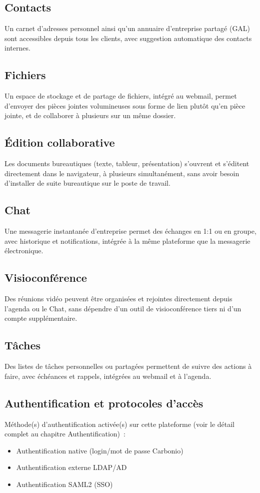 \documentclass[11pt,a4paper]{report}
\begin{document}
\subsection{Contacts}
Un carnet d'adresses personnel ainsi qu'un annuaire d'entreprise partagé (GAL) sont accessibles depuis tous les clients, avec suggestion automatique des contacts internes.\allowbreak{}

\subsection{Fichiers}
Un espace de stockage et de partage de fichiers, intégré au webmail, permet d'envoyer des pièces jointes volumineuses sous forme de lien plutôt qu'en pièce jointe, et de collaborer à plusieurs sur un même dossier.\allowbreak{}

\subsection{Édition collaborative}
Les documents bureautiques (texte, tableur, présentation) s'ouvrent et s'éditent directement dans le navigateur, à plusieurs simultanément, sans avoir besoin d'installer de suite bureautique sur le poste de travail.\allowbreak{}

\subsection{Chat}
Une messagerie instantanée d'entreprise permet des échanges en 1:1 ou en groupe, avec historique et notifications, intégrée à la même plateforme que la messagerie électronique.\allowbreak{}

\subsection{Visioconférence}
Des réunions vidéo peuvent être organisées et rejointes directement depuis l'agenda ou le Chat, sans dépendre d'un outil de visioconférence tiers ni d'un compte supplémentaire.\allowbreak{}

\subsection{Tâches}
Des listes de tâches personnelles ou partagées permettent de suivre des actions à faire, avec échéances et rappels, intégrées au webmail et à l'agenda.\allowbreak{}


\subsection{Authentification et protocoles d'accès}
Méthode(s) d'authentification activée(s) sur cette plateforme (voir le détail complet au chapitre Authentification)~:
\begin{itemize}[nosep]
  \item Authentification native (login/mot de passe Carbonio)
  \item Authentification externe LDAP/AD
  \item Authentification SAML2 (SSO)
\end{itemize}
\end{document}
